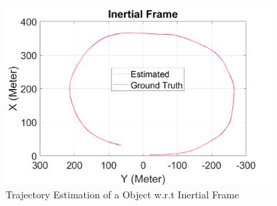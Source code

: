 \begin{figure}
    \centering
    \includegraphics[width=0.9\textwidth]{Images/Trajectory.pdf}
    \caption{Trajectory Estimation of a Object w.r.t Inertial Frame}
    \label{Trajectory_plot}
\end{figure}   

